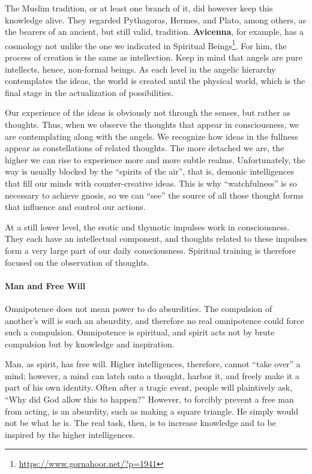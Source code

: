 The Muslim tradition, or at least one branch of it, did however keep this knowledge alive. They regarded Pythagoras, Hermes, and Plato, among others, as the bearers of an ancient, but still valid, tradition. \textbf{Avicenna}, for example, has a cosmology not unlike the one we indicated in Spiritual Beings\footnote{\url{https://www.gornahoor.net/?p=1941}}. For him, the process of creation is the same as intellection. Keep in mind that angels are pure intellects, hence, non-formal beings. As each level in the angelic hierarchy contemplates the ideas, the world is created until the physical world, which is the final stage in the actualization of possibilities.

Our experience of the ideas is obviously not through the senses, but rather as thoughts. Thus, when we observe the thoughts that appear in consciousness, we are contemplating along with the angels. We recognize how ideas in the fullness appear as constellations of related thoughts. The more detached we are, the higher we can rise to experience more and more subtle realms. Unfortunately, the way is usually blocked by the “spirits of the air”, that is, demonic intelligences that fill our minds with counter-creative ideas. This is why “watchfulness” is so necessary to achieve gnosis, so we can “see” the source of all those thought forms that influence and control our actions.

At a still lower level, the erotic and thymotic impulses work in consciousness. They each have an intellectual component, and thoughts related to these impulses form a very large part of our daily consciousness. Spiritual training is therefore focused on the observation of thoughts.

\paragraph{Man and Free Will}
\begin{quotex}
Omnipotence does not mean power to do absurdities. The compulsion of another's will is such an absurdity, and therefore no real omnipotence could force such a compulsion. Omnipotence is spiritual, and spirit acts not by brute compulsion but by knowledge and inspiration. 

\end{quotex}
Man, as spirit, has free will. Higher intelligences, therefore, cannot “take over” a mind; however, a mind can latch onto a thought, harbor it, and freely make it a part of his own identity. Often after a tragic event, people will plaintively ask, “Why did God allow this to happen?” However, to forcibly prevent a free man from acting, is an absurdity, such as making a square triangle. He simply would not be what he is. The real task, then, is to increase knowledge and to be inspired by the higher intelligences.

